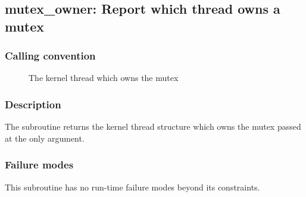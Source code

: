 \clearpage
{}
{}
\label{subr:mutex_owner}
\subsection*{mutex\_owner: Report which thread owns a mutex}

\subsubsection*{Calling convention}

\begin{description}
\item[] The kernel thread which owns the mutex
\item[] 
\end{description}

\subsubsection*{Description}

The  subroutine returns the kernel thread
structure which owns the mutex passed at the only argument.

\subsubsection*{Failure modes}

This subroutine has no run-time failure modes beyond its constraints.
